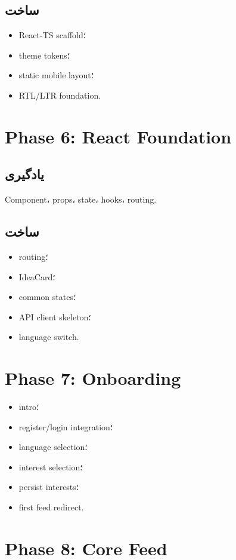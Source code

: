 \subsection*{ساخت}
\begin{itemize}
  \item React-TS scaffold؛
  \item theme tokens؛
  \item static mobile layout؛
  \item RTL/LTR foundation.
\end{itemize}

\section{Phase 6: React Foundation}

\subsection*{یادگیری}
Component، props، state، hooks، routing.

\subsection*{ساخت}
\begin{itemize}
  \item routing؛
  \item IdeaCard؛
  \item common states؛
  \item API client skeleton؛
  \item language switch.
\end{itemize}

\section{Phase 7: Onboarding}

\begin{itemize}
  \item intro؛
  \item register/login integration؛
  \item language selection؛
  \item interest selection؛
  \item persist interests؛
  \item first feed redirect.
\end{itemize}

\section{Phase 8: Core Feed}


